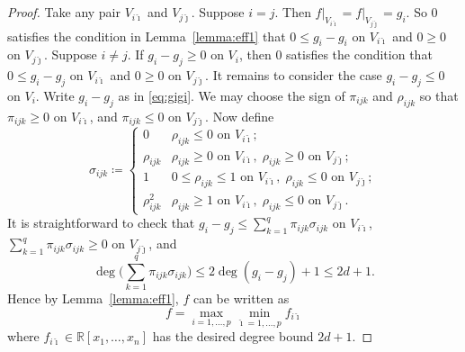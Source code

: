 \documentclass[11pt]{amsart}
\theoremstyle{plain}
\theoremstyle{definition}
\newcommand{\ih}{\hat{\imath}}
\newcommand{\jh}{\hat{\jmath}}
\begin{document}
\begin{proof}
Take any pair $V_{i \ih }$ and  $V_{j\jh }$. Suppose $i = j$. Then $f\rvert_{V_{i \ih }} = f\rvert_{V_{j\jh }} = g_i$. So $0$ satisfies the condition in Lemma~\ref{lemma:eff1} that $0 \le g_i-g_i$ on $V_{i \ih }$ and $0 \ge 0 $ on $V_{j\jh }$. Suppose $i \neq j$. If $g_i - g_j \ge 0$ on $V_i$, then $0$ satisfies the condition that $0 \le g_i-g_j$ on $V_{i \ih }$ and $0 \ge 0 $ on $V_{j\jh }$. It remains to consider the case $g_i - g_j \le 0$ on $V_i$. Write $g_i - g_j$ as in \eqref{eq:gigi}. We may choose the sign of $\pi_{ijk}$ and $\rho_{ijk}$ so that $\pi_{ijk} \ge 0$ on $V_{i \ih }$, and $\pi_{ijk} \le 0$ on $V_{j\jh }$. Now define
\[
\sigma_{ijk} \coloneqq \begin{cases}
0 &\rho_{ijk} \le 0  \text{ on } V_{i \ih };\\
\rho_{ijk} &\rho_{ijk} \ge 0  \text{ on } V_{i \ih },\; \rho_{ijk} \ge 0  \text{ on } V_{j\jh };\\
1 &0 \le \rho_{ijk} \le 1  \text{ on } V_{i \ih },\; \rho_{ijk} \le 0  \text{ on } V_{j\jh };\\
\rho_{ijk}^2 &\rho_{ijk} \ge 1  \text{ on } V_{i \ih },\; \rho_{ijk} \le 0  \text{ on } V_{j\jh }.
\end{cases}
\] 
It is straightforward to check that $g_i - g_j \le \sum_{k=1}^q \pi_{ijk} \sigma_{ijk}$ on $V_{i \ih }$,  $\sum_{k=1}^q \pi_{ijk} \sigma_{ijk} \ge 0$ on $V_{j\jh }$, and
\[
\deg \biggl( \sum_{k=1}^q \pi_{ijk}\sigma_{ijk}  \biggr) \le 2\deg (g_i - g_j) +1 \le 2d +1.
\]
Hence by Lemma~\ref{lemma:eff1}, $f$ can be written as
\[
f = \max_{i = 1, \dots, p} \min_{\ih  = 1, \dots, p} f_{i \ih }
\]
where $f_{i \ih } \in \mathbb{R}[x_1, \dots, x_n]$ has the desired degree bound $2d +1$.


\end{proof}
\end{document}
